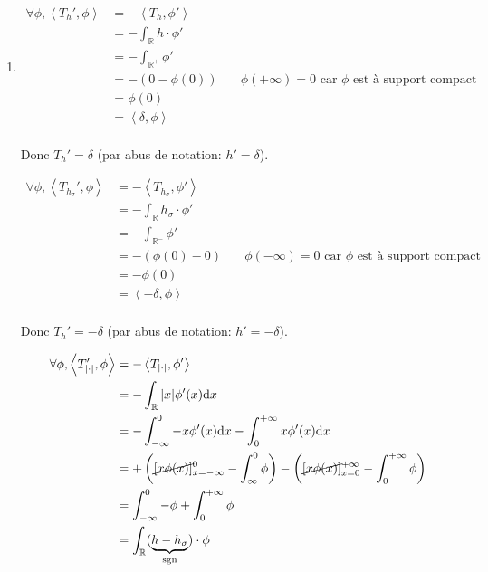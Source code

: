 \documentclass{article}
\renewcommand{\d}{\mathrm{d}}
\newcommand{\R}{\mathbb{R}}
\begin{document}
\begin{enumerate}
	\item 

		\begin{align*}
			\forall \phi, \left<T_h', \phi \right> &= - \left<T_h, \phi' \right> \\
			&= - \int_{\R} h  \cdot \phi' \\
			&= - \int_{\R^{+}} \phi' \\
			&= -(0 - \phi(0)) \quad&\text{$\phi(+\infty) = 0$ car $\phi$ est à support compact} \\
			&= \phi(0) \\
			&= \left<\delta, \phi \right> \\
		\end{align*}

		Donc $T_{h}' = \delta$ (par abus de notation: $h' = \delta$).

		
		\begin{align*}
			\forall \phi, \left<T_{h_\sigma}', \phi \right> &= - \left<T_{h_\sigma}, \phi' \right> \\
			&= - \int_{\R} h_\sigma  \cdot \phi' \\
			&= - \int_{\R^{-}} \phi' \\
			&= -(\phi(0) - 0) \quad&\text{$\phi(-\infty) = 0$ car $\phi$ est à support compact} \\
			&= -\phi(0) \\
			&= \left<-\delta, \phi \right> \\
		\end{align*}

		Donc $T_{h}' = -\delta$ (par abus de notation: $h' = -\delta$).

		\begin{align*}
			\forall \phi, \left<T_{| \cdot  |}', \phi \right> &=  - \left<T_{| \cdot |}, \phi' \right> \\
			&= -\int_\R |x| \phi'(x) \d x \\
			&= -\int_{-\infty}^0 -x \phi'(x) \d x - \int_0^{+\infty} x \phi'(x) \d x \\
			&= +\left(\cancel{\left[ x \phi(x) \right]}_{x=-\infty}^0 - \int_{\infty}^{0} \phi\right) - \left(\cancel{\left[ x \phi(x) \right]}_{x=0}^{+\infty} - \int_{0}^{+\infty} \phi  \right) \\
			&= \int_{-\infty}^0 -\phi + \int_0^{+\infty} \phi \\
			&= \int_{\R} (\underbrace{h - h_\sigma}_{\text{sgn}})  \cdot  \phi \\
		\end{align*}


\end{enumerate}
\end{document}
